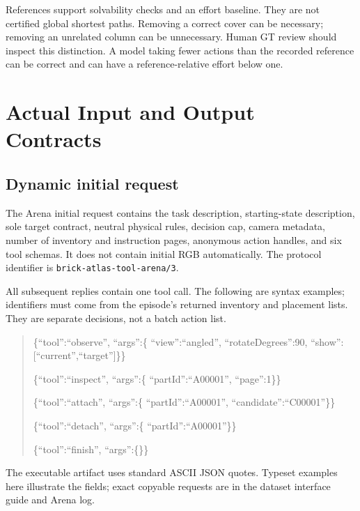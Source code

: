 \documentclass[10pt,twocolumn,letterpaper]{article}
\begin{document}
References support solvability checks and an effort baseline. They are not certified global shortest paths. Removing a correct cover can be necessary; removing an unrelated column can be unnecessary. Human GT review should inspect this distinction. A model taking fewer actions than the recorded reference can be correct and can have a reference-relative effort below one.

\section{Actual Input and Output Contracts}
\subsection{Dynamic initial request}
The Arena initial request contains the task description, starting-state description, sole target contract, neutral physical rules, decision cap, camera metadata, number of inventory and instruction pages, anonymous action handles, and six tool schemas. It does not contain initial RGB automatically. The protocol identifier is \texttt{brick-atlas-tool-arena/3}.

All subsequent replies contain one tool call. The following are syntax examples; identifiers must come from the episode's returned inventory and placement lists. They are separate decisions, not a batch action list.
\begin{quote}\small\ttfamily
\{``tool'':``observe'', ``args'':\{\newline
``view'':``angled'', ``rotateDegrees'':90,\newline
``show'':[``current'',``target'']\}\}\par
\{``tool'':``inspect'', ``args'':\{\newline
``partId'':``A00001'', ``page'':1\}\}\par
\{``tool'':``attach'', ``args'':\{\newline
``partId'':``A00001'',\newline
``candidate'':``C00001''\}\}\par
\{``tool'':``detach'', ``args'':\{\newline
``partId'':``A00001''\}\}\par
\{``tool'':``finish'', ``args'':\{\}\}
\end{quote}
The executable artifact uses standard ASCII JSON quotes. Typeset examples here illustrate the fields; exact copyable requests are in the dataset interface guide and Arena log.
\end{document}
